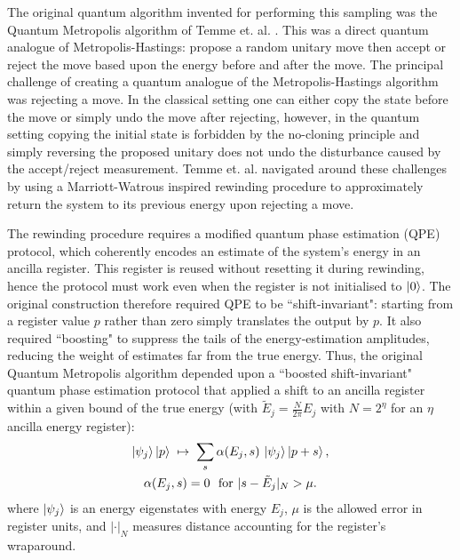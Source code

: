 \documentclass[aps,floatfix,10pt,amssymb,amsfont,amsmath,superscriptaddress,float,nofootinbib,longbibliography,nobalancelastpage,twocolumn]{revtex4-2}
\begin{document}
The original quantum algorithm invented for performing this sampling was the Quantum Metropolis algorithm of Temme et. al. \cite{Temme_2011}. This was a direct quantum analogue of Metropolis-Hastings: propose a random unitary move then accept or reject the move based upon the energy before and after the move. The principal challenge of creating a quantum analogue of the Metropolis-Hastings algorithm was rejecting a move. In the classical setting one can either copy the state before the move or simply undo the move after rejecting, however, in the quantum setting copying the initial state is forbidden by the no-cloning principle and simply reversing the proposed unitary does not undo the disturbance caused by the accept/reject measurement. Temme et. al. \cite{Temme_2011} navigated around these challenges by using a Marriott-Watrous \cite{MarriottWatrous} inspired rewinding procedure to approximately return the system to its previous energy upon rejecting a move.

The rewinding procedure requires a modified quantum phase estimation (QPE) protocol, which coherently encodes an estimate of the system’s energy in an ancilla register. This register is reused without resetting it during rewinding, hence the protocol must work even when the register is not initialised to $\ket{0}$. The original construction therefore required QPE to be ``shift-invariant": starting from a register value $p$ rather than zero simply translates the output by $p$. It also required ``boosting" to suppress the tails of the energy-estimation amplitudes, reducing the weight of estimates far from the true energy. Thus, the original Quantum Metropolis algorithm depended upon a  ``boosted shift-invariant" quantum phase estimation protocol that applied a shift to an ancilla register within a given bound of the true energy (with $\tilde E_j = \frac{N}{2\pi}E_j$ with $N=2^{\eta}$ for an $\eta$ ancilla energy register):
\begin{multline}
  \ket{\psi_j}\ket{p} \;\mapsto\; \sum_{s} \alpha(E_j,s)\,\ket{\psi_j}\ket{p+s},
  \\\alpha(E_j,s) = 0 \ \text{ for } |s-\tilde E_j|_{N} > \mu .
  \label{eq:Boostedshiftinvariantqpe}
\end{multline}
where $\ket{\psi_j}$ is an energy eigenstates with energy $E_j$, $\mu$ is the allowed error in register units, and $|\cdot|_{N}$ measures distance accounting for the register’s wraparound.
\end{document}
